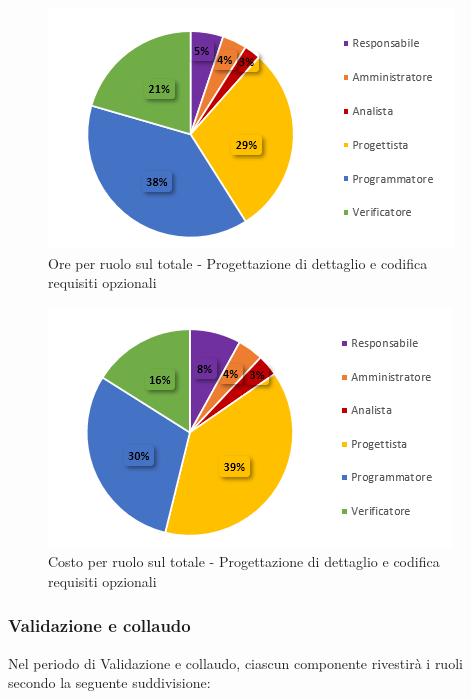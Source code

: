 \begin{figure}[H]
  \centering
  \includegraphics[scale=0.9]{immagini/ore_ruolo_reqOpzionali.png}
  \caption{Ore per ruolo sul totale - Progettazione di dettaglio e codifica requisiti opzionali}
\end{figure}

\begin{figure}[H]
  \centering
  \includegraphics[scale=0.9]{immagini/costo_ruolo_reqOpzionali.png}
  \caption{Costo per ruolo sul totale - Progettazione di dettaglio e codifica requisiti opzionali}
\end{figure}


\subsubsection{Validazione e collaudo}
Nel periodo di Validazione e collaudo, ciascun componente rivestirà i ruoli secondo la seguente suddivisione:

